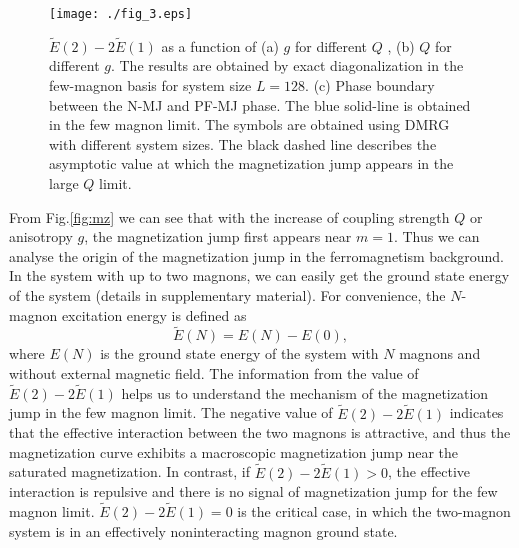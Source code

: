 \documentclass[article,10pt,onecolumn,superscriptaddress,floatfix]{revtex4}
\begin{document}
\begin{figure}[!tb] %
	\centering
	\texttt{[image: ./fig\_3.eps]}
	\caption{ $\tilde{E}(2)-2\tilde{E}(1)$  as a function of (a) $g$ for different $Q$ , (b) $Q$ for different $g$. The results are obtained by exact diagonalization in the few-magnon basis for system size $L=128$. (c) Phase boundary between the N-MJ and PF-MJ phase. The blue solid-line is obtained in the few magnon limit. The symbols are obtained using DMRG with different system sizes. The black dashed line describes the asymptotic value at which the magnetization jump appears in the large $Q$ limit.}
	\label{fig:e1e2_compare}
\end{figure}

From Fig.\ref{fig:mz} we can see that with the increase of coupling strength $Q$ or anisotropy $g$, the magnetization jump first appears near $m=1$. Thus we can analyse the origin of the magnetization jump in the ferromagnetism background. In the system with up to two magnons, we can easily get the ground state energy of the system (details in supplementary material).
For convenience, the $N$-magnon excitation energy is defined as
\begin{equation}\label{eq:tilde_E}
	\tilde{E}(N)=E(N)-E(0),
\end{equation}
where $E(N)$ is the ground state energy of the system with $N$ magnons and without external magnetic field.
The information from the value of $\tilde{E}(2)-2\tilde{E}(1)$ helps us to understand the mechanism of the magnetization jump in the few magnon limit.
The negative value of $\tilde{E}(2)-2\tilde{E}(1)$ indicates that the effective interaction between the two magnons is attractive, and thus the magnetization curve exhibits a macroscopic magnetization jump near the saturated magnetization. In contrast, if $\tilde{E}(2)-2\tilde{E}(1)>0$, the effective interaction is repulsive and there is no signal of magnetization jump for the few magnon limit. $\tilde{E}(2)-2\tilde{E}(1)=0$ is the critical case, in which the two-magnon system is in an effectively noninteracting magnon ground state.
\end{document}
